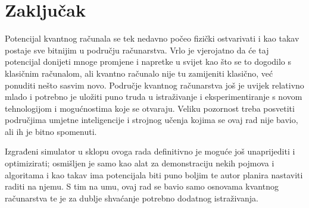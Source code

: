 \chapter{Zaključak}

Potencijal kvantnog računala se tek nedavno počeo fizički ostvarivati i kao takav postaje sve bitnijim u području računarstva. Vrlo je vjerojatno da će taj potencijal donijeti mnoge promjene i napretke u svijet kao što se to dogodilo s klasičnim računalom, ali kvantno računalo nije tu zamijeniti klasično, već ponuditi nešto sasvim novo. Područje kvantnog računarstva još je uvijek relativno mlado i potrebno je uložiti puno truda u istraživanje i eksperimentiranje s novom tehnologijom i mogućnostima koje se otvaraju. Veliku pozornost treba posvetiti područjima umjetne inteligencije i strojnog učenja kojima se ovaj rad nije bavio, ali ih je bitno spomenuti.

Izgrađeni simulator u sklopu ovoga rada definitivno je moguće još unaprijediti i optimizirati; osmišljen je samo kao alat za demonstraciju nekih pojmova i algoritama i kao takav ima potencijala biti puno boljim te autor planira nastaviti raditi na njemu. S tim na umu, ovaj rad se bavio samo osnovama kvantnog računarstva te je za dublje shvaćanje potrebno dodatnog istraživanja.


